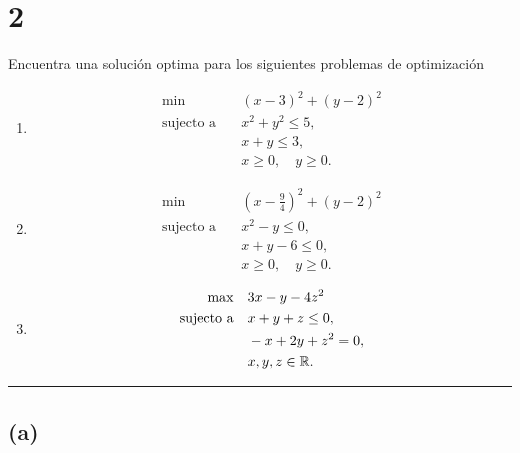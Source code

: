 \section*{2}

Encuentra una solución optima para los siguientes problemas de optimización
\begin{enumerate}[label=(\alph*)]
    \item 
        \begin{equation*}
        \begin{aligned}
            \min \quad & (x - 3)^2 + (y - 2)^2 \\
            \text{sujecto a} \quad & x^2 + y^2 \leq 5, \\
                & x + y \leq 3, \\
                & x \geq 0, \quad y \geq 0.
        \end{aligned}
        \end{equation*}

    \item 
        \begin{equation*}
        \begin{aligned}
            \min \quad & (x - \frac{9}{4})^2 + (y - 2)^2 \\
            \text{sujecto a} \quad & x^2 - y \leq 0, \\
                & x + y - 6 \leq 0, \\
                & x \geq 0, \quad y \geq 0.
        \end{aligned}
        \end{equation*}

    \item 
        \begin{equation*}
        \begin{aligned}
            \max \quad & 3 x - y - 4 z^2 \\
            \text{sujecto a} \quad & x + y + z \leq 0, \\
                & -x + 2y + z^2 = 0, \\
                & x, y, z \in \mathbb{R}.
        \end{aligned}
        \end{equation*}

\end{enumerate}

\noindent\rule{10cm}{0.4pt}

\subsection*{(a)}

